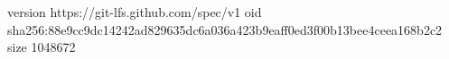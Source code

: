 version https://git-lfs.github.com/spec/v1
oid sha256:88e9cc9dc14242ad829635dc6a036a423b9eaff0ed3f00b13bee4ceea168b2c2
size 1048672
